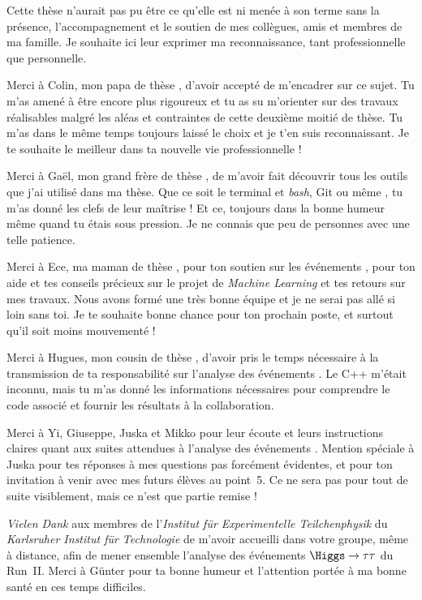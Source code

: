 Cette thèse n'aurait pas pu être ce qu'elle est
ni menée à son terme
sans la présence, l'accompagnement et le soutien
de mes collègues, amis et membres de ma famille.
Je souhaite ici leur exprimer ma reconnaissance,
tant professionnelle que personnelle.
\par
Merci à Colin, mon \og papa de thèse \fg,
d'avoir accepté de m'encadrer sur ce sujet.
Tu m'as amené à être encore plus rigoureux
et
tu as su m'orienter sur des travaux réalisables
malgré les aléas et contraintes de cette deuxième moitié de thèse.
Tu m'as dans le même temps toujours laissé le choix et je t'en suis reconnaissant.
Je te souhaite le meilleur dans ta nouvelle vie professionnelle !
\par
Merci à Gaël, mon \og grand frère de thèse \fg,
de m'avoir fait découvrir tous les outils que j'ai utilisé dans ma thèse.
Que ce soit le terminal et \emph{bash}, Git ou même \HEPPY,
tu m'as donné les clefs de leur maîtrise !
Et ce, toujours dans la bonne humeur même quand tu étais sous pression.
Je ne connais que peu de personnes avec une telle patience.
\par
Merci à Ece, ma \og maman de thèse \fg,
pour ton soutien sur les événements \Gjets,
pour ton aide et tes conseils précieux sur le projet de \emph{Machine Learning}
et tes retours sur mes travaux.
Nous avons formé une très bonne équipe
et
je ne serai pas allé si loin sans toi.
Je te souhaite bonne chance pour ton prochain poste,
et surtout qu'il soit moins mouvementé !
\par
Merci à Hugues, mon \og cousin de thèse \fg,
d'avoir pris le temps nécessaire à la transmission
de ta responsabilité sur l'analyse des événements \Gjets.
Le C++ m'était inconnu,
mais tu m'as donné les informations nécessaires pour comprendre
le code associé et fournir les résultats à la collaboration.
\par
Merci à
Yi,
Giuseppe,
Juska
et
Mikko
pour leur écoute et leurs instructions claires
quant aux suites attendues à l'analyse des événements \Gjets.
Mention spéciale à Juska pour tes réponses à mes questions pas forcément évidentes,
et pour ton invitation à venir avec mes futurs élèves au point~5.
Ce ne sera pas pour tout de suite visiblement, mais ce n'est que partie remise !
\par
\emph{Vielen Dank} aux membres de l'\emph{Institut für Experimentelle Teilchenphysik}
du \emph{Karlsruher Institut für Technologie}
de m'avoir accueilli dans votre groupe, même à distance,
afin de mener ensemble l'analyse des événements $\Higgs\to\tau\tau$ du Run~II.
Merci à Günter pour ta bonne humeur et l'attention portée à ma bonne santé en ces temps difficiles.
